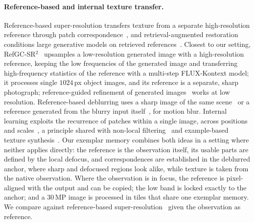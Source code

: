 \paragraph{Reference-based and internal texture transfer.}
Reference-based super-resolution transfers texture from a separate high-resolution reference through
patch correspondence~\cite{zhang2019srntt,yang2020ttsr,jiang2021c2matching,lu2021masasr,cao2022datsr},
and retrieval-augmented restoration conditions large generative models on retrieved
references~\cite{guo2024refir,lee2025irag}. Closest to our setting, RefGC-SR$^2$~\cite{sung2026refgcsr2} upsamples a
low-resolution generated image with a high-resolution reference, keeping the low frequencies of the generated image and
transferring high-frequency statistics of the reference with a multi-step FLUX-Kontext model; it processes single
$1024$\,px object images, and its reference is a separate, sharp photograph; reference-guided refinement of
generated images~\cite{song2025refinebyalign} works at low resolution. Reference-based deblurring uses a sharp image
of the same scene~\cite{zou2023refmotiondeblur} or a reference generated from the blurry input
itself~\cite{kim2025refdeblur}, for motion blur. Internal learning exploits the recurrence of patches within a single
image, across positions and scales~\cite{glasner2009single,zontak2011internal,shocher2018zssr}, a
principle shared with non-local filtering~\cite{buades2005nlm} and example-based texture
synthesis~\cite{efros1999texture,hertzmann2001analogies,barnes2009patchmatch}. Our exemplar memory
combines both ideas in a setting where neither applies directly: the reference is the observation
itself, its usable parts are defined by the local defocus, and correspondences are established in the
deblurred anchor, where sharp and defocused regions look alike, while texture is taken from the native
observation. Where the observation is in focus, the reference is pixel-aligned with the output and can be copied;
the low band is locked exactly to the anchor; and a $30$\,MP image is processed in tiles that share one exemplar
memory. We compare against reference-based super-resolution~\cite{cao2022datsr,guo2024refir,lee2025irag} given the
observation as reference.

